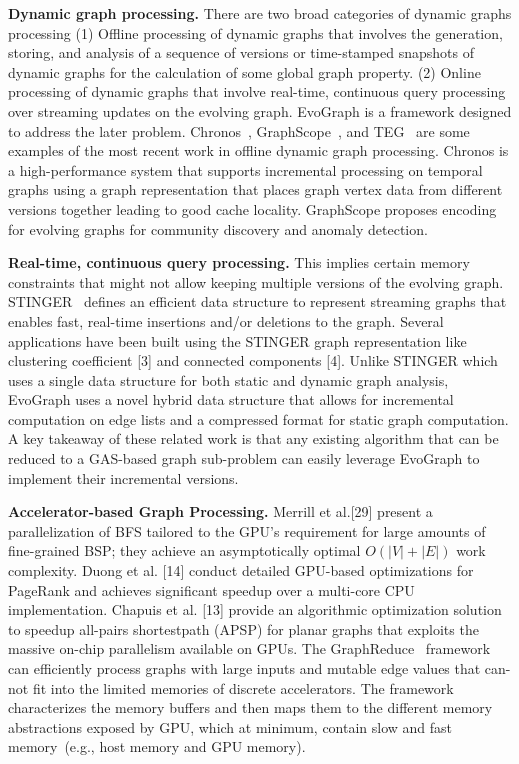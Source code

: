 \textbf{Dynamic graph processing.} There are two broad categories of dynamic graphs processing (1) Offline processing of dynamic graphs that involves the generation, storing, and analysis of a sequence of versions or time-stamped snapshots of dynamic graphs for the calculation of some global graph property. (2) Online processing of dynamic graphs that  involve real-time, continuous query processing over streaming updates on the evolving graph. EvoGraph is a framework designed to address the later problem.
Chronos~\cite{chronos}, GraphScope~\cite{graphscope}, and TEG~\cite{teg} are some examples of the most recent work in offline dynamic graph processing. Chronos is a high-performance system that supports incremental processing on temporal graphs using a graph representation that places graph vertex data from different versions together leading to good cache locality. GraphScope proposes encoding for evolving graphs for community discovery and anomaly detection. 

\textbf{Real-time, continuous query processing.} This implies certain memory constraints that might not allow keeping multiple versions of the evolving graph. STINGER~\cite{stinger} defines an efficient data structure to represent streaming graphs that enables fast, real-time insertions and/or deletions to the graph. Several applications have been built using the STINGER graph representation like clustering coefficient [3] and connected components [4]. Unlike STINGER which uses a single data structure for both static and dynamic graph analysis, EvoGraph uses a novel hybrid data structure that allows for incremental computation on edge lists and a compressed format for static graph computation.  A key takeaway of these related work is that any existing algorithm that can be reduced to a GAS-based graph sub-problem can easily leverage EvoGraph to implement their incremental versions.


\textbf{Accelerator-based Graph Processing.}
Merrill et al.[29] present a parallelization of BFS tailored to the GPU’s requirement for large amounts of fine-grained BSP; they achieve an asymptotically optimal $O(|V | + |E|)$ work complexity. Duong et al. [14] conduct detailed GPU-based optimizations for PageRank and achieves significant speedup over a multi-core CPU implementation. Chapuis et al. [13] provide an algorithmic optimization solution to speedup all-pairs shortestpath (APSP) for planar graphs that exploits the massive on-chip parallelism available on GPUs. 	The GraphReduce~\cite{GR} framework can efficiently process graphs with large inputs and mutable edge values that can-not fit into the limited memories of discrete accelerators. The framework characterizes the memory buffers and then maps them to the different memory abstractions exposed by GPU, which at minimum, contain slow and fast memory~\cite{nemu}(e.g., host memory and GPU memory). 		 


